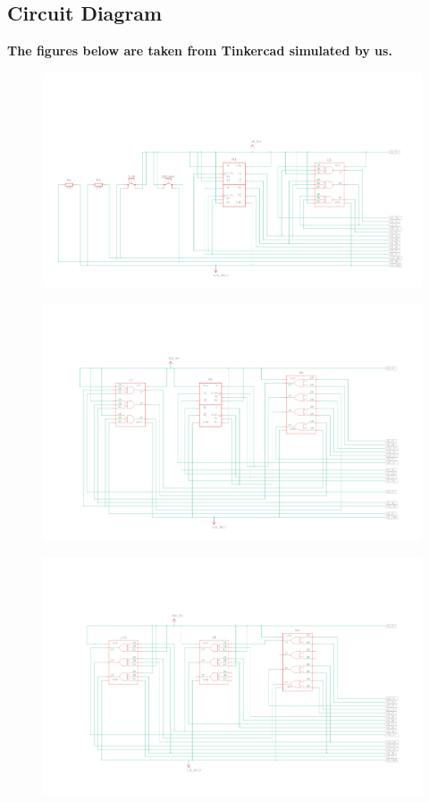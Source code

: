 \documentclass[a4paper,12pt]{article}
\begin{document}
\subsection{\textbf{Circuit Diagram}}
\textbf{The figures below are taken from Tinkercad simulated by us.}
\begin{figure}[H]
\centering
\includegraphics[width=1\textwidth]{figs/c1.png}
\caption{}
\end{figure}
\begin{figure}[H]
\centering    
\includegraphics[width=1\textwidth]{figs/c2.png} 
\caption{}
\end{figure}
\begin{figure}[H]
\centering    
\includegraphics[width=1\textwidth]{figs/c3.png}
\caption{}
\end{figure}
\end{document}
